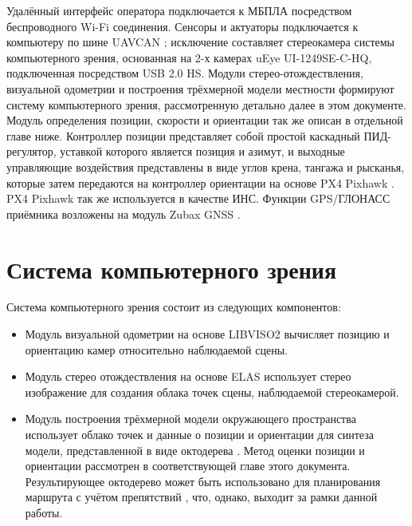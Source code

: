 \documentclass[11pt,a4paper]{article}
\begin{document}
Удалённый интерфейс оператора подключается к МБПЛА посредством беспроводного Wi-Fi соединения. Сенсоры и актуаторы подключается к компьютеру по шине UAVCAN \cite{UAVCAN}; исключение составляет стереокамера системы компьютерного зрения, основанная на 2-х камерах uEye UI-1249SE-C-HQ, подключенная посредством USB 2.0 HS. Модули стерео-отождествления, визуальной одометрии и построения трёхмерной модели местности формируют систему компьютерного зрения, рассмотренную детально далее в этом документе. Модуль определения позиции, скорости и ориентации так же описан в отдельной главе ниже. Контроллер позиции представляет собой простой каскадный ПИД-регулятор, уставкой которого является позиция и азимут, и выходные управляющие воздействия представлены в виде углов крена, тангажа и рысканья, которые затем передаются на контроллер ориентации на основе PX4 Pixhawk \cite{Pixhawk}. PX4 Pixhawk так же используется в качестве ИНС. Функции GPS/ГЛОНАСС приёмника возложены на модуль Zubax GNSS \cite{ZubaxGNSS}.

\newpage

\section{Система компьютерного зрения}

Система компьютерного зрения состоит из следующих компонентов:

\begin{itemize}
    \item Модуль визуальной одометрии на основе LIBVISO2 \cite{Geiger2011IV} вычисляет позицию и ориентацию камер относительно наблюдаемой сцены.
    \item Модуль стерео отождествления на основе ELAS \cite{Geiger10} использует стерео изображение для создания облака точек сцены, наблюдаемой стереокамерой.
    \item Модуль построения трёхмерной модели окружающего пространства использует облако точек и данные о позиции и ориентации для синтеза модели, представленной в виде октодерева \cite{rensselaer1980octree}. Метод оценки позиции и ориентации рассмотрен в соответствующей главе этого документа. Результирующее октодерево может быть использовано для планирования маршрута с учётом препятствий \cite{FraundorferHHLMTP12}, что, однако, выходит за рамки данной работы.
\end{itemize}
\end{document}
